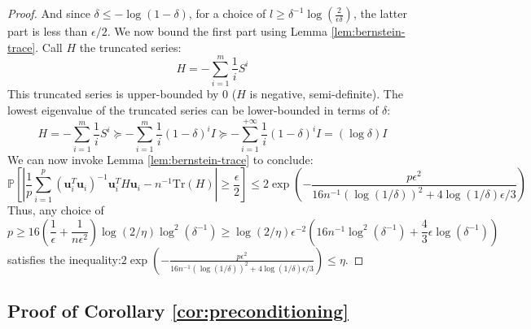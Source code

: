 \begin{proof}
And since $\delta\le-\log\left(1-\delta\right)$, for a choice of
$l\geq\delta^{-1}\log\left(\frac{2}{\epsilon\delta}\right)$, the
latter part is less than $\epsilon/2$. We now bound the first part
using Lemma \ref{lem:bernstein-trace}. Call $H$ the truncated series:
\[
H=-\sum_{i=1}^{m}\frac{1}{i}S^{i}
\]
This truncated series is upper-bounded by $0$ ($H$ is negative,
semi-definite). The lowest eigenvalue of the truncated series can
be lower-bounded in terms of $\delta$: 
\[
H=-\sum_{i=1}^{m}\frac{1}{i}S^{i}\succeq-\sum_{i=1}^{m}\frac{1}{i}\left(1-\delta\right)^{i}I\succeq-\sum_{i=1}^{+\infty}\frac{1}{i}\left(1-\delta\right)^{i}I=\left(\log\delta\right)I
\]
We can now invoke Lemma \ref{lem:bernstein-trace} to conclude: 
\[
\mathbb{P}\left[\left|\frac{1}{p}\sum_{i=1}^{p}\left(\mathbf{u}_{i}^{T}\mathbf{u}_{i}\right)^{-1}\mathbf{u}_{i}^{T}H\mathbf{u}_{i}-n^{-1}\mbox{Tr}\left(H\right)\right|\geq\frac{\epsilon}{2}\right]\leq2\exp\left(-\frac{p\epsilon^{2}}{16n^{-1}\left(\log\left(1/\delta\right)\right)^{2}+4\log\left(1/\delta\right)\epsilon/3}\right)
\]
Thus, any choice of 
\[
p\geq16\left(\frac{1}{\epsilon}+\frac{1}{n\epsilon^{2}}\right)\log\left(2/\eta\right)\log^{2}\left(\delta^{-1}\right)\geq\log\left(2/\eta\right)\epsilon^{-2}\left(16n^{-1}\log^{2}\left(\delta^{-1}\right)+\frac{4}{3}\epsilon\log\left(\delta^{-1}\right)\right)
\]
satisfies the inequality:$2\exp\left(-\frac{p\epsilon^{2}}{16n^{-1}\left(\log\left(1/\delta\right)\right)^{2}+4\log\left(1/\delta\right)\epsilon/3}\right)\leq\eta$.

\end{proof}


\subsection{Proof of Corollary \ref{cor:preconditioning}}

